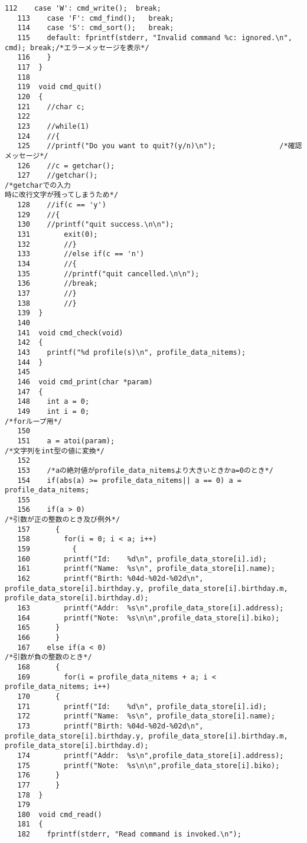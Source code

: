 \begin{Verbatim}[fontsize=\small, baselinestretch=0.8]
   112	  case 'W': cmd_write();  break;
   113	  case 'F': cmd_find();   break;
   114	  case 'S': cmd_sort();   break;
   115	  default: fprintf(stderr, "Invalid command %c: ignored.\n", cmd); break;/*エラーメッセージを表示*/
   116	  }
   117	}
   118	
   119	void cmd_quit()
   120	{
   121	  //char c;
   122	
   123	  //while(1)
   124	  //{
   125	  //printf("Do you want to quit?(y/n)\n");               /*確認メッセージ*/
   126	  //c = getchar();
   127	  //getchar();                                           /*getcharでの入力
時に改行文字が残ってしまうため*/
   128	  //if(c == 'y')
   129	  //{
   130	  //printf("quit success.\n\n");
   131		  exit(0);
   132		  //}
   133		  //else if(c == 'n')
   134		  //{
   135		  //printf("quit cancelled.\n\n");
   136		  //break;
   137		  //}
   138		  //}
   139	}
   140	
   141	void cmd_check(void)
   142	{
   143	  printf("%d profile(s)\n", profile_data_nitems);
   144	}
   145	
   146	void cmd_print(char *param)
   147	{
   148	  int a = 0;
   149	  int i = 0;                                                 /*forループ用*/
   150	
   151	  a = atoi(param);                                           /*文字列をint型の値に変換*/
   152	
   153	  /*aの絶対値がprofile_data_nitemsより大きいときかa=0のとき*/
   154	  if(abs(a) >= profile_data_nitems|| a == 0) a = profile_data_nitems;
   155	
   156	  if(a > 0)                                                  /*引数が正の整数のとき及び例外*/
   157	    {
   158	      for(i = 0; i < a; i++)
   159	        {
   160		  printf("Id:    %d\n", profile_data_store[i].id);
   161		  printf("Name:  %s\n", profile_data_store[i].name);
   162		  printf("Birth: %04d-%02d-%02d\n", profile_data_store[i].birthday.y, profile_data_store[i].birthday.m, profile_data_store[i].birthday.d);
   163		  printf("Addr:  %s\n",profile_data_store[i].address);
   164		  printf("Note:  %s\n\n",profile_data_store[i].biko);
   165		}
   166	    }
   167	  else if(a < 0)                                             /*引数が負の整数のとき*/
   168	    {
   169	      for(i = profile_data_nitems + a; i < profile_data_nitems; i++)
   170		{
   171		  printf("Id:    %d\n", profile_data_store[i].id);
   172		  printf("Name:  %s\n", profile_data_store[i].name);
   173		  printf("Birth: %04d-%02d-%02d\n", profile_data_store[i].birthday.y, profile_data_store[i].birthday.m, profile_data_store[i].birthday.d);
   174		  printf("Addr:  %s\n",profile_data_store[i].address);
   175		  printf("Note:  %s\n\n",profile_data_store[i].biko);
   176		}
   177	    }
   178	}
   179	
   180	void cmd_read()
   181	{
   182	  fprintf(stderr, "Read command is invoked.\n");

\end{Verbatim}
